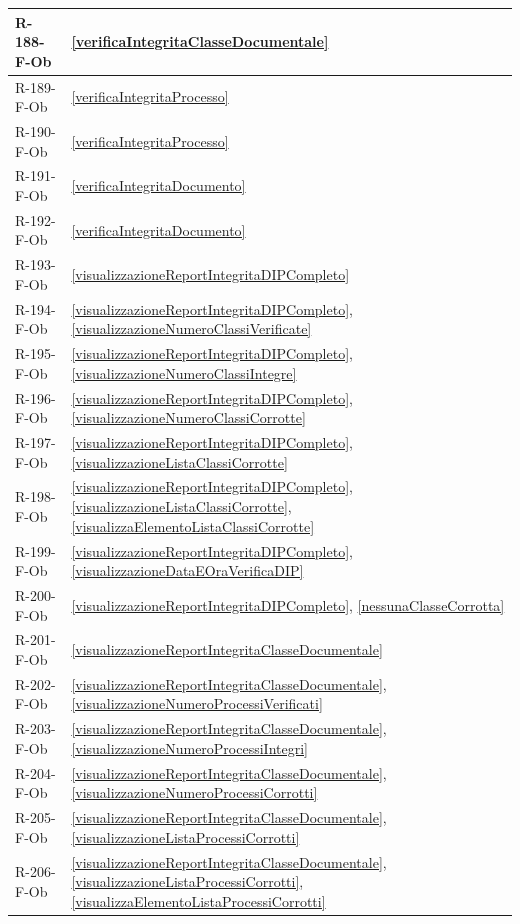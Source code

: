 \begin{longtable}{|p{4cm}|p{10cm}|}
\hline
R-188-F-Ob & \ref{verificaIntegritaClasseDocumentale} \\
\hline
R-189-F-Ob & \ref{verificaIntegritaProcesso} \\
\hline
R-190-F-Ob & \ref{verificaIntegritaProcesso} \\
\hline
R-191-F-Ob & \ref{verificaIntegritaDocumento} \\
\hline
R-192-F-Ob & \ref{verificaIntegritaDocumento} \\
\hline
R-193-F-Ob & \ref{visualizzazioneReportIntegritaDIPCompleto} \\
\hline
R-194-F-Ob & \ref{visualizzazioneReportIntegritaDIPCompleto}, \ref{visualizzazioneNumeroClassiVerificate} \\
\hline
R-195-F-Ob & \ref{visualizzazioneReportIntegritaDIPCompleto}, \ref{visualizzazioneNumeroClassiIntegre} \\
\hline
R-196-F-Ob & \ref{visualizzazioneReportIntegritaDIPCompleto}, \ref{visualizzazioneNumeroClassiCorrotte} \\
\hline
R-197-F-Ob & \ref{visualizzazioneReportIntegritaDIPCompleto}, \ref{visualizzazioneListaClassiCorrotte} \\
\hline
R-198-F-Ob & \ref{visualizzazioneReportIntegritaDIPCompleto}, \ref{visualizzazioneListaClassiCorrotte}, \ref{visualizzaElementoListaClassiCorrotte} \\
\hline
R-199-F-Ob & \ref{visualizzazioneReportIntegritaDIPCompleto}, \ref{visualizzazioneDataEOraVerificaDIP} \\
\hline
R-200-F-Ob & \ref{visualizzazioneReportIntegritaDIPCompleto}, \ref{nessunaClasseCorrotta} \\
\hline
R-201-F-Ob & \ref{visualizzazioneReportIntegritaClasseDocumentale} \\
\hline
R-202-F-Ob & \ref{visualizzazioneReportIntegritaClasseDocumentale}, \ref{visualizzazioneNumeroProcessiVerificati} \\
\hline
R-203-F-Ob & \ref{visualizzazioneReportIntegritaClasseDocumentale}, \ref{visualizzazioneNumeroProcessiIntegri} \\
\hline
R-204-F-Ob & \ref{visualizzazioneReportIntegritaClasseDocumentale}, \ref{visualizzazioneNumeroProcessiCorrotti} \\
\hline
R-205-F-Ob & \ref{visualizzazioneReportIntegritaClasseDocumentale}, \ref{visualizzazioneListaProcessiCorrotti} \\
\hline
R-206-F-Ob & \ref{visualizzazioneReportIntegritaClasseDocumentale}, \ref{visualizzazioneListaProcessiCorrotti}, \ref{visualizzaElementoListaProcessiCorrotti} \\

\end{longtable}
